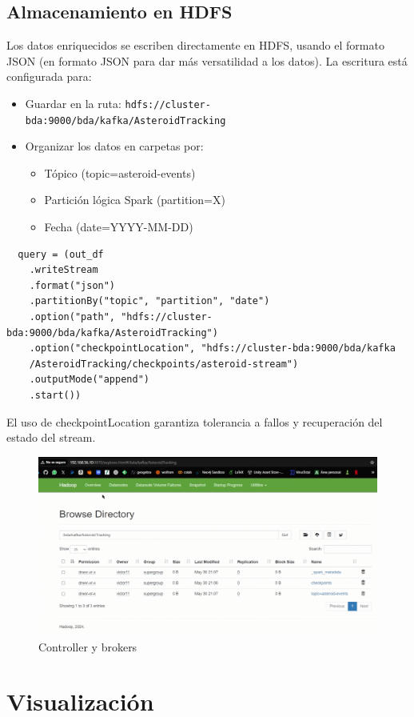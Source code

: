 \documentclass[12pt]{article}
\begin{document}
\subsection{Almacenamiento en HDFS}

Los datos enriquecidos se escriben directamente en HDFS, usando el formato JSON (en formato JSON para dar más versatilidad a
los datos). La escritura está configurada para:

\begin{itemize}
  \item Guardar en la ruta: \texttt{hdfs://cluster-bda:9000/bda/kafka/AsteroidTracking}
  \item Organizar los datos en carpetas por:
  \begin{itemize}
    \item Tópico (topic=asteroid-events)
    \item Partición lógica Spark (partition=X)
    \item Fecha (date=YYYY-MM-DD)
  \end{itemize}
\end{itemize}

\begin{verbatim}
  query = (out_df
    .writeStream
    .format("json")
    .partitionBy("topic", "partition", "date")
    .option("path", "hdfs://cluster-bda:9000/bda/kafka/AsteroidTracking")
    .option("checkpointLocation", "hdfs://cluster-bda:9000/bda/kafka
    /AsteroidTracking/checkpoints/asteroid-stream")
    .outputMode("append")
    .start())
\end{verbatim}

El uso de checkpointLocation garantiza tolerancia a fallos y recuperación del estado del stream.

\begin{figure}[h!]
    \centering
    \includegraphics[width=.7\textwidth]{assets/proyecto/hdfs.PNG}
    \caption{Controller y brokers}
    \label{fig:my_label}
\end{figure}

\section{Visualización}
\end{document}

